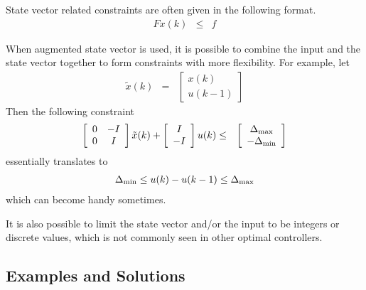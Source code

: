 State vector related constraints are often given in the following format.
\begin{eqnarray}
	Fx(k) &\leq& f \nonumber
\end{eqnarray}

When augmented state vector is used, it is possible to combine the input and the state vector together to form constraints with more flexibility. For example, let
\begin{eqnarray}
	\tilde{x}(k) &=& \left[\begin{array}{c}
		x(k) \\ u(k-1)
	\end{array}\right] \nonumber
\end{eqnarray}
Then the following constraint
\begin{eqnarray}
	\left[\begin{array}{cc}
		0 & -I \\ 0 & I
	\end{array}\right]\tilde{x}(k) + \left[\begin{array}{c}
	I \\ -I
\end{array}\right]u(k) &\leq& \left[\begin{array}{c}
\Delta_{\textup{max}} \\ -\Delta_{\textup{min}}
\end{array}\right] \nonumber
\end{eqnarray}
essentially translates to
\begin{eqnarray}
	\Delta_{\textup{min}} \leq u(k) - u(k-1) \leq \Delta_{\textup{max}} \nonumber
\end{eqnarray}
which can become handy sometimes.

It is also possible to limit the state vector and/or the input to be integers or discrete values, which is not commonly seen in other optimal controllers.

\subsection{Examples and Solutions}








